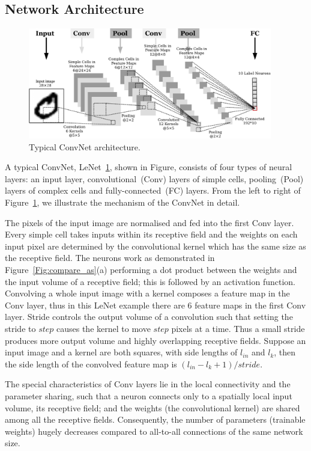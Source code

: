 \subsection{Network Architecture}

	\begin{figure}[bt]
		\centering
		\includegraphics[width=0.95\textwidth]{pics_snn/convnet.pdf}
		\caption{Typical ConvNet architecture.}
		\label{Fig:ConvNet}
	\end{figure}

A typical ConvNet, LeNet~\ref{Fig:ConvNet}, shown in Figure, consists of four types of neural layers: an input layer, convolutional~(Conv) layers of simple cells, pooling~(Pool) layers of complex cells and fully-connected~(FC) layers.
From the left to right of Figure~\ref{Fig:ConvNet}, we illustrate the mechanism of the ConvNet in detail.

The pixels of the input image are normalised and fed into the first Conv layer.
Every simple cell takes inputs within its receptive field and the weights on each input pixel are determined by the convolutional kernel which has the same size as the receptive field.
The neurons work as demonstrated in Figure~\ref{Fig:compare_as}(a) performing a dot product between the weights and the input volume of a receptive field; this is followed by an activation function.
Convolving a whole input image with a kernel composes a feature map in the Conv layer, thus in this LeNet example there are 6 feature maps in the first Conv layer.
Stride controls the output volume of a convolution such that setting the stride to $step$ causes the kernel to move $step$ pixels at a time.
Thus a small stride produces more output volume and highly overlapping receptive fields.
Suppose an input image and a kernel are both squares, with side lengths of $l_{in}$ and $l_k$, then the side length of the convolved feature map is $(l_{in} - l_k + 1)/stride$.

The special characteristics of Conv layers lie in the local connectivity and the parameter sharing, such that a neuron connects only to a spatially local input volume, its receptive field; and the weights (the convolutional kernel) are shared among all the receptive fields.
Consequently, the number of parameters (trainable weights) hugely decreases compared to all-to-all connections of the same network size. 

